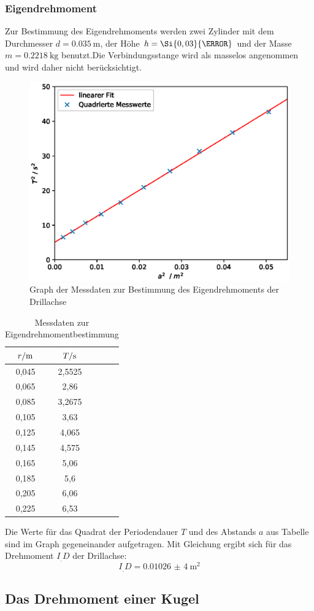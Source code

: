 \subsubsection{Eigendrehmoment}
Zur Bestimmung des Eigendrehmoments werden zwei Zylinder mit dem Durchmesser $d = \SI{0,035}{\metre}$, der Höhe $h = \Si{0,03}{\metre}$ und der Masse $m = \SI{0,2218}{\kilogram}$ benutzt.\newline Die Verbindungsstange wird als masselos angenommen und wird daher nicht berücksichtigt.
\begin{figure}
\centering
\includegraphics[scale = .75,keepaspectratio]
	{content/images/plot1.eps}
\caption{Graph der Messdaten zur Bestimmung des Eigendrehmoments der Drillachse}%
\end{figure}
\begin{table}
	\centering
	\caption{Messdaten zur Eigendrehmomentbestimmung}
	\begin{tabular}{S[table-format=3.2] S[table-format=3.2]S[table-format=3.2]S[table-format=3.2]}
		\toprule
		{$r/\si[per-mode=reciprocal]{\metre}$}&{$T/\si[per-mode=reciprocal]{\second}$} \\
		,045 & 2,5525 \\
		0,065 & 2,86 \\
		0,085 & 3,2675 \\
		0,105 & 3,63 \\
		0,125 & 4,065 \\
		0,145 & 4,575 \\
		0,165 & 5,06 \\
		0,185 & 5,6 \\
		0,205 & 6,06 \\
		0,225 & 6,53 \\
		\bottomrule
	\end{tabular}
\end{table}
Die Werte für das Quadrat der Periodendauer $T$ und des Abstands $a$ aus Tabelle %
sind im Graph %
gegeneinander aufgetragen.
Mit Gleichung %
ergibt sich für das Drehmoment $I_.D$ der Drillachse:
\[I_.D=\SI{0,01026(4)}{\metre\squared}\]
\subsection{Das Drehmoment einer Kugel}
